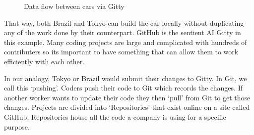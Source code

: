 \begin{figure}[h]
    \centering
    \centering
    \caption{Data flow between cars via Gitty}
    \label{fig:tikz-diagram}
\end{figure}


That way, both Brazil and Tokyo can build the car locally without duplicating any of the work done by their counterpart. GitHub is the sentient AI Gitty in this example.
Many coding projects are large and complicated with hundreds of contributers so its important to have something that can allow them to work efficiently with each other.

In our analogy, Tokyo or Brazil would submit their changes to Gitty. In Git, we call this `pushing'. Coders push their code to Git which records the
changes. If another worker wants to update their code they then `pull' from Git to get those changes. Projects are divided into `Repositories' that exist online on 
a site called GitHub. Repositories house all the code a company is using for a specific purpose. 

